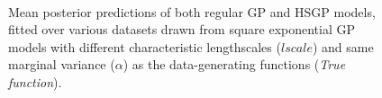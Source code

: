 \documentclass[]{interact}
\theoremstyle{plain}%
\theoremstyle{definition}
\theoremstyle{remark}
\begin{document}
\begin{figure}
\\
\vspace{-3mm}
\caption{Mean posterior predictions of both regular GP and HSGP models, fitted over various datasets drawn from square exponential GP models with different characteristic lengthscales ($lscale$) and same marginal variance ($\alpha$) as the data-generating functions (\textit{True function}).}
  \label{fig7_posterior_varing_lscale_part1}
\end{figure}
\end{document}
